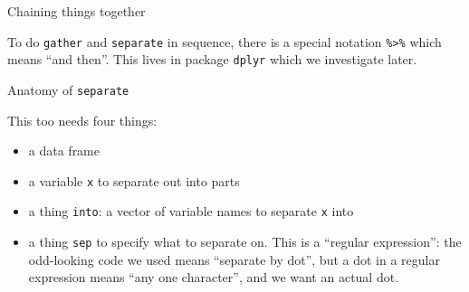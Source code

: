 \begin{frame}[fragile]{Chaining things together}
  
  To do \texttt{gather} and \texttt{separate} in sequence, there is a
  special notation \texttt{\%>\%} which means
  ``and then''. This lives in package \texttt{dplyr} which we
  investigate later. 


  {\footnotesize
\begin{knitrout}
\color{fgcolor}
\end{knitrout}
}
  
\end{frame}


\begin{frame}[fragile]{Anatomy of \texttt{separate}}
  
  This too needs four things:
  
  \begin{itemize}
  \item a data frame
  \item a variable \texttt{x} to separate out into parts
  \item a thing \texttt{into}: a vector of variable names to separate
    \texttt{x} into
  \item a thing \texttt{sep} to specify what to separate on. This is a
    ``regular expression'': the odd-looking code we used means
    ``separate by dot'', but a dot in a regular expression means ``any
    one character'', and we want an actual dot.
  \end{itemize}
  
  
\end{frame}


